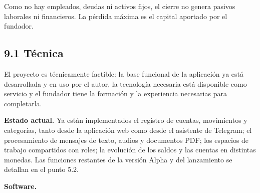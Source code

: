 Como no hay empleados, deudas ni activos fijos, el cierre no genera
pasivos laborales ni financieros. La pérdida máxima es el capital
aportado por el fundador.


\subsection*{9.1 Técnica}\label{tuxe9cnica}

El proyecto es técnicamente factible: la base funcional de la aplicación
ya está desarrollada y en uso por el autor, la tecnología necesaria está
disponible como servicio y el fundador tiene la formación y la
experiencia necesarias para completarla.

\textbf{Estado actual.} Ya están implementados el registro de cuentas,
movimientos y categorías, tanto desde la aplicación web como desde el
asistente de Telegram; el procesamiento de mensajes de texto, audios y
documentos PDF; los espacios de trabajo compartidos con roles; la
evolución de los saldos y las cuentas en distintas monedas. Las
funciones restantes de la versión Alpha y del lanzamiento se detallan en
el punto 5.2.

\textbf{Software.}

